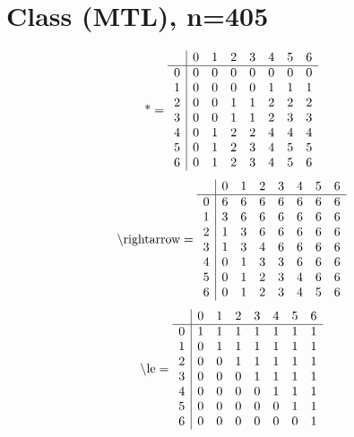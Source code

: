 \documentclass[11pt]{article}
\begin{document}
\section{Class (MTL), n=405}
\[\text{*} = 
\begin{array}{r | r r r r r r r}
 & 0 & 1 & 2 & 3 & 4 & 5 & 6 \\ \hline
0 & 0 & 0 & 0 & 0 & 0 & 0 & 0 \\
1 & 0 & 0 & 0 & 0 & 1 & 1 & 1 \\
2 & 0 & 0 & 1 & 1 & 2 & 2 & 2 \\
3 & 0 & 0 & 1 & 1 & 2 & 3 & 3 \\
4 & 0 & 1 & 2 & 2 & 4 & 4 & 4 \\
5 & 0 & 1 & 2 & 3 & 4 & 5 & 5 \\
6 & 0 & 1 & 2 & 3 & 4 & 5 & 6 \\
\end{array}
\]
\[\text{\textbackslash rightarrow} = 
\begin{array}{r | r r r r r r r}
 & 0 & 1 & 2 & 3 & 4 & 5 & 6 \\ \hline
0 & 6 & 6 & 6 & 6 & 6 & 6 & 6 \\
1 & 3 & 6 & 6 & 6 & 6 & 6 & 6 \\
2 & 1 & 3 & 6 & 6 & 6 & 6 & 6 \\
3 & 1 & 3 & 4 & 6 & 6 & 6 & 6 \\
4 & 0 & 1 & 3 & 3 & 6 & 6 & 6 \\
5 & 0 & 1 & 2 & 3 & 4 & 6 & 6 \\
6 & 0 & 1 & 2 & 3 & 4 & 5 & 6 \\
\end{array}
\]
\[\text{\textbackslash le} = 
\begin{array}{r | r r r r r r r}
 & 0 & 1 & 2 & 3 & 4 & 5 & 6 \\ \hline
0 & 1 & 1 & 1 & 1 & 1 & 1 & 1 \\
1 & 0 & 1 & 1 & 1 & 1 & 1 & 1 \\
2 & 0 & 0 & 1 & 1 & 1 & 1 & 1 \\
3 & 0 & 0 & 0 & 1 & 1 & 1 & 1 \\
4 & 0 & 0 & 0 & 0 & 1 & 1 & 1 \\
5 & 0 & 0 & 0 & 0 & 0 & 1 & 1 \\
6 & 0 & 0 & 0 & 0 & 0 & 0 & 1 \\
\end{array}
\]
\end{document}
